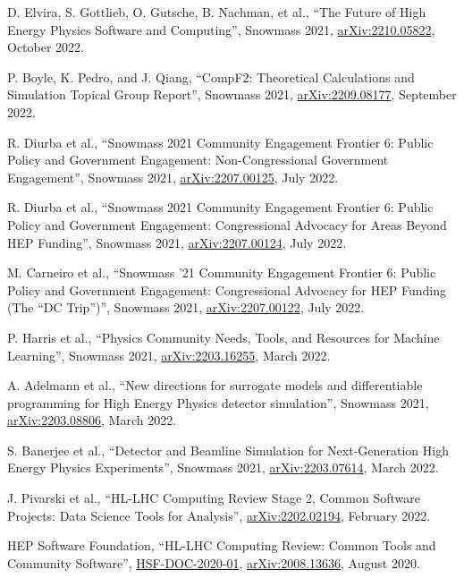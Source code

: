 \begin{description}[leftmargin=12pt,font=\normalfont,labelsep=0em]
\item D. Elvira, S. Gottlieb, O. Gutsche, B. Nachman, et al., ``The Future of High Energy Physics Software and Computing'', Snowmass 2021, \href{https://arxiv.org/abs/2210.05822}{arXiv:2210.05822}, October 2022. %
\item P. Boyle, K. Pedro, and J. Qiang, ``CompF2: Theoretical Calculations and Simulation Topical Group Report'', Snowmass 2021, \href{https://arxiv.org/abs/2209.08177}{arXiv:2209.08177}, September 2022. %
\item R. Diurba et al., ``Snowmass 2021 Community Engagement Frontier 6: Public Policy and Government Engagement: Non-Congressional Government Engagement'', Snowmass 2021, \href{https://arxiv.org/abs/2207.00125}{arXiv:2207.00125}, July 2022. %
\item R. Diurba et al., ``Snowmass 2021 Community Engagement Frontier 6: Public Policy and Government Engagement: Congressional Advocacy for Areas Beyond HEP Funding'', Snowmass 2021, \href{https://arxiv.org/abs/2207.00124}{arXiv:2207.00124}, July 2022. %
\item M. Carneiro et al., ``Snowmass '21 Community Engagement Frontier 6: Public Policy and Government Engagement: Congressional Advocacy for HEP Funding (The ``DC Trip'')'', Snowmass 2021, \href{https://arxiv.org/abs/2207.00122}{arXiv:2207.00122}, July 2022. %
\item P. Harris et al., ``Physics Community Needs, Tools, and Resources for Machine Learning'', Snowmass 2021, \href{https://arxiv.org/abs/2203.16255}{arXiv:2203.16255}, March 2022. %
\item A. Adelmann et al., ``New directions for surrogate models and differentiable programming for High Energy Physics detector simulation'', Snowmass 2021, \href{https://arxiv.org/abs/2203.08806}{arXiv:2203.08806}, March 2022. %
\item S. Banerjee et al., ``Detector and Beamline Simulation for Next-Generation High Energy Physics Experiments'', Snowmass 2021, \href{https://arxiv.org/abs/2203.07614}{arXiv:2203.07614}, March 2022. %
\item J. Pivarski et al., ``HL-LHC Computing Review Stage 2, Common Software Projects: Data Science Tools for Analysis'', \href{https://arxiv.org/abs/2202.02194}{arXiv:2202.02194}, February 2022. %
\item HEP Software Foundation, ``HL-LHC Computing Review: Common Tools and Community Software'', \href{https://dx.doi.org/10.5281/zenodo.4009114}{HSF-DOC-2020-01}, \href{https://arxiv.org/abs/2008.13636}{arXiv:2008.13636}, August 2020. %

\end{description}
